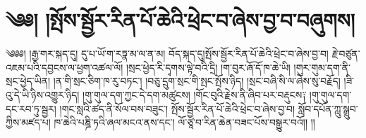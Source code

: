 \setcounter{footnote}{0} 
\chapter{༄༅། །སྤོས་སྦྱོར་རིན་པོ་ཆེའི་ཕྲེང་བ་ཞེས་བྱ་བ་བཞུགས།}༄༅༅། །རྒྱ་གར་སྐད་དུ། དུ་པ་ཡོ་ག་རཏྣ་མ་ལ་ན་མ། བོད་སྐད་དུ།སྤོས་སྦྱོར་རིན་པོ་ཆེའི་ཕྲེང་བ་ཞེས་བྱ་བ། རྗེ་བཙུན་འཇམ་པའི་དབྱངས་ལ་ཕྱག་འཚལ་ལོ། །སྲང་ཕྱེད་རི་དྭགས་ལྟེ་བའི་དྲི། །ག་བུར་ཞོ་དོ་ཁ་ཆེ་ཡི། །གུར་གུམ་དག་ནི་སྲང་ཕྱེད་ཡིན། །ན་གི་སྲང་ཅིག་ཁ་རུ་བཏང་། །བཅུ་དྲུག་སྲང་གི་སྤང་སྤོས་ཉིད། །སྲང་བཞི་སི་ལ་ཞེས་སུ་བརྗོད། །ཟི་འུ་དེ་ཡི་ཉིས་འགྱུར་ཉིད། །གུ་གུལ་དག་ཀྱང་དེ་དག་མཚུངས། །གོང་བུའི་རྗེས་ནི་ཞིབ་པར་བརྡུངས༑ །གུ་གུལ་དག་དང་རབ་ཏུ་སྦྱར། །གང་སླའི་ཚད་ནི་སོལ་བས་བཟུང་། སྤོས་སྦྱོར་རིན་པོ་ཆེའི་ཕྲེང་བ་ཞེས་བྱ་བ། སློབ་དཔོན་ཀླུ་སྒྲུབ་ཀྱིས་མཛད་པ། ཁ་ཆེའི་པཎྜི་ཏའི་ཞལ་མངའ་ནས་དང་། ལོ་ཙཱ་བ་རིན་ཆེན་བཟང་པོས་བསྒྱུར་བའོ།། །།